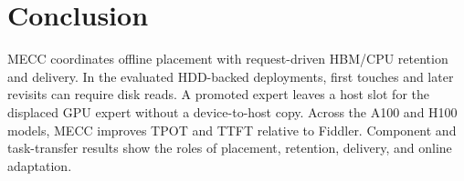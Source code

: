 \section{Conclusion}
MECC coordinates offline placement with request-driven HBM/CPU retention and delivery. In the evaluated HDD-backed deployments, first touches and later revisits can require disk reads. A promoted expert leaves a host slot for the displaced GPU expert without a device-to-host copy. Across the A100 and H100 models, MECC improves TPOT and TTFT relative to Fiddler. Component and task-transfer results show the roles of placement, retention, delivery, and online adaptation.

